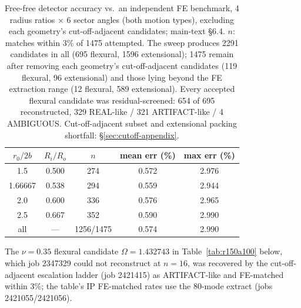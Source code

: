 \documentclass[11pt]{article}
\begin{document}
\begin{table}[!htbp]\centering\small
\caption{Free-free detector accuracy vs.\ an independent FE benchmark,
4 radius ratios $\times$ 6 sector angles (both motion types), excluding
each geometry's cut-off-adjacent candidates; main-text \S6.4.
$n$: matches within 3\% of 1475 attempted. The sweep produces 2291
candidates in all (695 flexural, 1596 extensional); 1475 remain after
removing each geometry's cut-off-adjacent candidates (119 flexural, 96
extensional) and those lying beyond the FE extraction range (12 flexural,
589 extensional). Every accepted flexural
candidate was residual-screened: 654 of 695 reconstructed, 329 REAL-like /
321 ARTIFACT-like / 4 AMBIGUOUS. Cut-off-adjacent subset and
extensional packing shortfall: \S\ref{sec:cutoff-appendix}.}
\label{tab:geomsweep}
\begin{tabular}{ccccc}
\toprule $r_0/2b$ & $R_i/R_o$ & $n$ & mean err (\%) & max err (\%)\\ \midrule
1.5 & 0.500 & 274 & 0.572 & 2.976\\
1.66667 & 0.538 & 294 & 0.559 & 2.944\\
2.0 & 0.600 & 336 & 0.576 & 2.965\\
2.5 & 0.667 & 352 & 0.590 & 2.990\\ \midrule
all & --- & 1256/1475 & 0.574 & 2.990\\
\bottomrule
\end{tabular}
\end{table}

The $\nu=0.35$ flexural candidate $\Omega=1.432743$ in
Table~\ref{tab:r150a100} below, which job 2347329 could not reconstruct
at $n{=}16$, was recovered by the cut-off-adjacent escalation ladder
(job 2421415) as ARTIFACT-like and FE-matched within $3\%$; the table's
IP FE-matched rates use the 80-mode extract (jobs 2421055/2421056).
\end{document}
